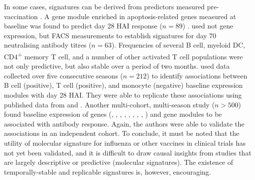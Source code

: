In some cases, signatures can be derived from predictors measured pre-vaccination \autocite{tsang2020ImprovingVaccineinducedImmunity}.
A gene module enriched in apoptosis-related genes measured at baseline was found to predict day 28 \gls{HAI} response ($n=89$) \autocite{furman2013ApoptosisOtherImmune}.
\textcite{tsang2014GlobalAnalysesHuman} used not gene expression, but \gls{FACS} measurements to establish signatures for day 70 neutralising antibody titres ($n=63$).
Frequencies of several B cell, myeloid \gls{DC}, CD4\textsuperscript{+} memory T cell, and a number of other activated T cell populations were not only predictive, but also stable over a period of two months. 
\autocite{nakaya2015SystemsAnalysisImmunity} used data collected over five consecutive seasons ($n=212$) to identify associations between B cell (positive), T cell (positive), and monocyte (negative) baseline expression modules with day 28 \gls{HAI}.
They were able to replicate these associations using published data from \textcite{franco2013IntegrativeGenomicAnalysis} and \textcite{furman2013ApoptosisOtherImmune}.
Another multi-cohort, multi-season study ($n > 500$) \autocite{hipc-chisignaturesprojectteam2017MulticohortAnalysisReveals} found baseline expression of genes (, , , , , , , , ) and gene modules to be associated with antibody response.
Again, the authors were able to validate the associations in an independent cohort.
To conclude, it must be noted that the utility of molecular signature for influenza or other vaccines in clinical trials has not yet been validated,
and it is difficult to draw causal insights from studies that are largely descriptive or predictive (molecular signatures).
The existence of temporally-stable and replicable signatures is, however, encouraging.

%

